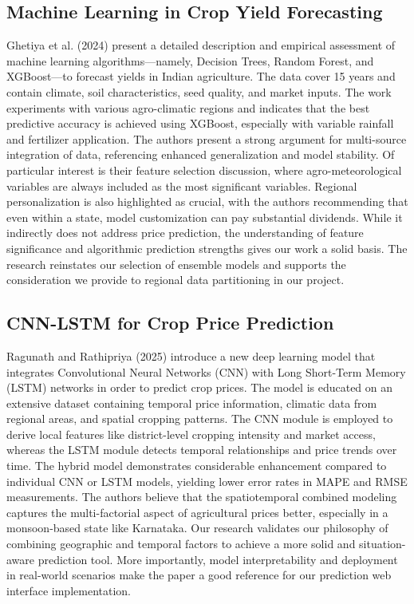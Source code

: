 \subsection{Machine Learning in Crop Yield Forecasting \cite{ghetiya2024ml}}
Ghetiya et al. (2024) present a detailed description and empirical assessment of machine learning algorithms—namely, Decision Trees, Random Forest, and XGBoost—to forecast yields in Indian agriculture. The data cover 15 years and contain climate, soil characteristics, seed quality, and market inputs. The work experiments with various agro-climatic regions and indicates that the best predictive accuracy is achieved using XGBoost, especially with variable rainfall and fertilizer application. The authors present a strong argument for multi-source integration of data, referencing enhanced generalization and model stability. Of particular interest is their feature selection discussion, where agro-meteorological variables are always included as the most significant variables. Regional personalization is also highlighted as crucial, with the authors recommending that even within a state, model customization can pay substantial dividends. While it indirectly does not address price prediction, the understanding of feature significance and algorithmic prediction strengths gives our work a solid basis. The research reinstates our selection of ensemble models and supports the consideration we provide to regional data partitioning in our project.

\subsection{CNN-LSTM for Crop Price Prediction \cite{ragunath2025cnn}}
Ragunath and Rathipriya (2025) introduce a new deep learning model that integrates Convolutional Neural Networks (CNN) with Long Short-Term Memory (LSTM) networks in order to predict crop prices. The model is educated on an extensive dataset containing temporal price information, climatic data from regional areas, and spatial cropping patterns. The CNN module is employed to derive local features like district-level cropping intensity and market access, whereas the LSTM module detects temporal relationships and price trends over time. The hybrid model demonstrates considerable enhancement compared to individual CNN or LSTM models, yielding lower error rates in MAPE and RMSE measurements. The authors believe that the spatiotemporal combined modeling captures the multi-factorial aspect of agricultural prices better, especially in a monsoon-based state like Karnataka. Our research validates our philosophy of combining geographic and temporal factors to achieve a more solid and situation-aware prediction tool. More importantly, model interpretability and deployment in real-world scenarios make the paper a good reference for our prediction web interface implementation.


